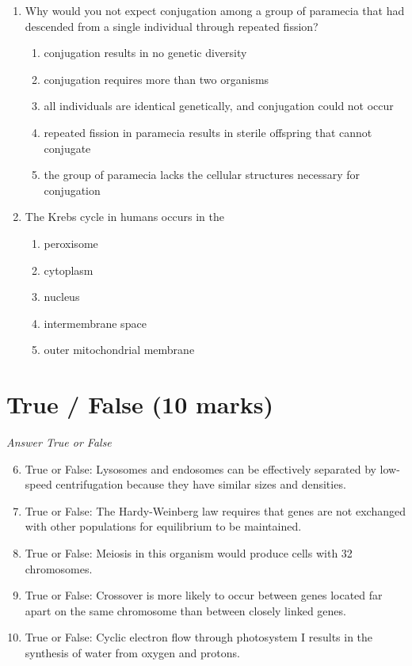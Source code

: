 \documentclass[12pt]{article}
\begin{document}
\begin{enumerate}[label=\arabic*.]
\begin{enumerate}[label=(\alph*)]
    \item Courtship is necessary for physical transformation required for reproduction
\end{enumerate}
\item Why would you not expect conjugation among a group of paramecia that had descended from a single individual through repeated fission?
\begin{enumerate}[label=(\alph*)]
    \item conjugation results in no genetic diversity
    \item conjugation requires more than two organisms
    \item all individuals are identical genetically, and conjugation could not occur
    \item repeated fission in paramecia results in sterile offspring that cannot conjugate
    \item the group of paramecia lacks the cellular structures necessary for conjugation
\end{enumerate}
\item The Krebs cycle in humans occurs in the
\begin{enumerate}[label=(\alph*)]
    \item peroxisome
    \item cytoplasm
    \item nucleus
    \item intermembrane space
    \item outer mitochondrial membrane
\end{enumerate}
\end{enumerate}

\section*{True / False (10 marks)}
\textit{Answer True or False}
\begin{enumerate}[label=\arabic*.]
\setcounter{enumi}{5}
\item True or False: Lysosomes and endosomes can be effectively separated by low-speed centrifugation because they have similar sizes and densities.
\item True or False: The Hardy-Weinberg law requires that genes are not exchanged with other populations for equilibrium to be maintained.
\item True or False: Meiosis in this organism would produce cells with 32 chromosomes.
\item True or False: Crossover is more likely to occur between genes located far apart on the same chromosome than between closely linked genes.
\item True or False: Cyclic electron flow through photosystem I results in the synthesis of water from oxygen and protons.
\end{enumerate}
\end{document}
